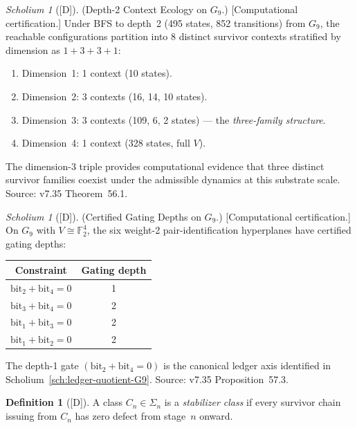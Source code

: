\documentclass[12pt,oneside]{amsbook}
\theoremstyle{plain}
\theoremstyle{definition}
\newtheorem{definition}[theorem]{Definition}
\theoremstyle{remark}
\newtheorem{scholium}[theorem]{Scholium}
\newcommand{\status}[1]{\textup{[#1]}}
\begin{document}
\begin{scholium}[\status{D}]\label{sch:depth2-ecology-G9}
\textup{(Depth-2 Context Ecology on $G_9$.)}  \textup{[Computational
certification.]}
Under BFS to depth~2 (495 states, 852 transitions) from $G_9$, the
reachable configurations partition into 8 distinct survivor contexts
stratified by dimension as $1 + 3 + 3 + 1$:
\begin{enumerate}[label=\textup{(\arabic*)}]
  \item Dimension~1: 1 context (10 states).
  \item Dimension~2: 3 contexts (16, 14, 10 states).
  \item Dimension~3: 3 contexts (109, 6, 2 states) — the
        \emph{three-family structure}.
  \item Dimension~4: 1 context (328 states, full $V$).
\end{enumerate}
The dimension-3 triple provides computational evidence that three
distinct survivor families coexist under the admissible dynamics at
this substrate scale.  Source: v7.35 Theorem~56.1.
\end{scholium}

\begin{scholium}[\status{D}]\label{sch:gating-depths-G9}
\textup{(Certified Gating Depths on $G_9$.)}  \textup{[Computational
certification.]}
On $G_9$ with $V \cong \mathbb{F}_2^4$, the six weight-2
pair-identification hyperplanes have certified gating depths:
\begin{center}
\begin{tabular}{cc}
\hline
Constraint & Gating depth \\
\hline
$\mathrm{bit}_2 + \mathrm{bit}_4 = 0$ & 1 \\
$\mathrm{bit}_3 + \mathrm{bit}_4 = 0$ & 2 \\
$\mathrm{bit}_1 + \mathrm{bit}_3 = 0$ & 2 \\
$\mathrm{bit}_1 + \mathrm{bit}_2 = 0$ & 2 \\
\hline
\end{tabular}
\end{center}
The depth-1 gate $(\mathrm{bit}_2 + \mathrm{bit}_4 = 0)$ is the
canonical ledger axis identified in
Scholium~\ref{sch:ledger-quotient-G9}.  Source: v7.35
Proposition~57.3.
\end{scholium}

\begin{definition}[\status{D}]\label{def:stabilizer-class}
A class $C_n \in \Sigma_n$ is a \emph{stabilizer class} if every
survivor chain issuing from $C_n$ has zero defect from stage~$n$
onward.
\end{definition}
\end{document}
